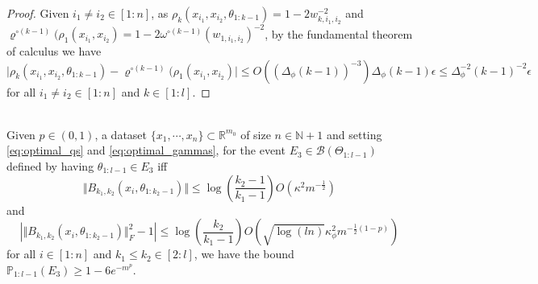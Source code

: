 \documentclass[twoside,11pt]{article}
\newcommand{\R}{\mathbb{R}}
\newcommand{\N}{\mathbb{N}}
\newcommand{\Prob}{\mathbb{P}}
\begin{document}
\begin{proof}
Given $i_1 \neq i_2 \in [1:n]$, as $\rho_k(x_{i_1},x_{i_2},\theta_{1:k-1}) = 1-2w_{k,i_1,i_2}^{-2}$ and $\varrho^{\circ(k-1)}(\rho_1(x_{i_1},x_{i_2}) = 1-2\omega^{\circ (k-1)}(w_{1,i_1,i_2})^{-2}$, by the fundamental theorem of calculus we have $\vert \rho_k(x_{i_1},x_{i_2},\theta_{1:k-1}) - \varrho^{\circ(k-1)}(\rho_1(x_{i_1},x_{i_2}) \vert \leq O((\Delta_\phi(k-1))^{-3}) \Delta_\phi (k-1) \epsilon \leq \Delta_\phi^{-2} (k-1)^{-2} \epsilon$ for all $i_1 \neq i_2 \in [1:n]$ and $k \in [1:l]$.
\end{proof}

\begin{proposition}\label{prop:limiting_backprop_norm_concentration}~\\
Given $p \in (0,1)$, a dataset $\{x_1,\cdots,x_n\} \subset \R^{m_0}$ of size $n \in \N+1$ and setting \eqref{eq:optimal_qs} and \eqref{eq:optimal_gammas}, for the event $E_3 \in \mathcal{B}(\Theta_{1:l-1})$ defined by having $\theta_{1:l-1} \in E_3$ iff
\[
\Vert B_{k_1, k_2}(x_i, \theta_{1 : k_2-1}) \Vert \leq \log\left( \frac{k_2-1}{k_1-1} \right) O\left( \kappa^2 m^{-\frac{1}{2}} \right)
\]
and
\[
\left\vert \Vert B_{k_1,k_2}(x_i, \theta_{1 : k_2-1}) \Vert_F^2 - 1 \right\vert
\leq \log\left( \frac{k_2}{k_1-1} \right) O\left( \sqrt{\log(ln)} \kappa_\phi^2 m^{-\frac{1}{2}(1-p)} \right)
\]
for all $i \in [1:n]$ and $k_1 \leq k_2 \in [2:l]$, we have the bound $\Prob_{1:l-1}(E_3) \geq 1 - 6e^{-m^p}$.
\end{proposition}
\end{document}
